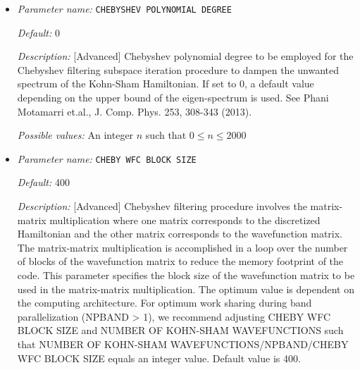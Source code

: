 \begin{itemize}


{\it Default:} 1e-02


{\it Description:} [Advanced] Parameter specifying the accuracy of the occupied eigenvectors close to the Fermi-energy computed using Chebyshev filtering subspace iteration procedure. Default value is sufficient for most purposes


{\it Possible values:} A floating point number $v$ such that $1e-10 \leq v \leq \text{MAX\_DOUBLE}$
\item {\it Parameter name:} {\tt CHEBYSHEV POLYNOMIAL DEGREE}
\label{parameters:SCF parameters/Eigen_2dsolver parameters/CHEBYSHEV POLYNOMIAL DEGREE}
\label{parameters:SCF_20parameters/Eigen_2dsolver_20parameters/CHEBYSHEV_20POLYNOMIAL_20DEGREE}




{\it Default:} 0


{\it Description:} [Advanced] Chebyshev polynomial degree to be employed for the Chebyshev filtering subspace iteration procedure to dampen the unwanted spectrum of the Kohn-Sham Hamiltonian. If set to 0, a default value depending on the upper bound of the eigen-spectrum is used. See Phani Motamarri et.al., J. Comp. Phys. 253, 308-343 (2013).


{\it Possible values:} An integer $n$ such that $0\leq n \leq 2000$
\item {\it Parameter name:} {\tt CHEBY WFC BLOCK SIZE}
\label{parameters:SCF parameters/Eigen_2dsolver parameters/CHEBY WFC BLOCK SIZE}
\label{parameters:SCF_20parameters/Eigen_2dsolver_20parameters/CHEBY_20WFC_20BLOCK_20SIZE}




{\it Default:} 400


{\it Description:} [Advanced] Chebyshev filtering procedure involves the matrix-matrix multiplication where one matrix corresponds to the discretized Hamiltonian and the other matrix corresponds to the wavefunction matrix. The matrix-matrix multiplication is accomplished in a loop over the number of blocks of the wavefunction matrix to reduce the memory footprint of the code. This parameter specifies the block size of the wavefunction matrix to be used in the matrix-matrix multiplication. The optimum value is dependent on the computing architecture. For optimum work sharing during band parallelization (NPBAND > 1), we recommend adjusting CHEBY WFC BLOCK SIZE and NUMBER OF KOHN-SHAM WAVEFUNCTIONS such that NUMBER OF KOHN-SHAM WAVEFUNCTIONS/NPBAND/CHEBY WFC BLOCK SIZE equals an integer value. Default value is 400.



\end{itemize}
